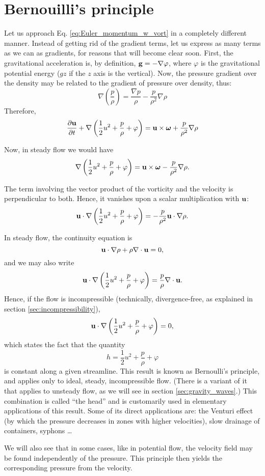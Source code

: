 \section{Bernouilli's principle}

Let us approach Eq. \ref{eq:Euler_momentum_w_vort} in a completely
different manner. Instead of getting rid of the gradient terms, let us
express as many terms as we can as gradients, for reasons that will
become clear soon. First, the gravitational acceleration is, by
definition, $\mathbf{g} = -\nabla\varphi$, where $\varphi $ is the
gravitational potential energy ($g z$ if the $z$ axis is the
vertical). Now, the pressure gradient over the density may be related
to the gradient of pressure over density, thus:
\[
\nabla
\left(
\frac{p}{\rho}
\right) =
\frac{ \nabla p }{\rho} -
\frac{ p }{\rho^2} \nabla \rho 
\]
Therefore,
\begin{equation}
  \label{eq:Bern_unsteady}
  \frac{\partial \mathbf{u} }{\partial t} +
  \nabla
  \left(
    \frac12 u^2 +
    \frac{p}{\rho} +
    \varphi
  \right)
  =
  \mathbf{u} \times\bm{\omega} +
  \frac{ p }{\rho^2} \nabla \rho 
 \end{equation}

Now, in steady flow we would have
\[
\nabla
\left(
\frac12 u^2 +
\frac{p}{\rho} +
\varphi
\right)
=
  \mathbf{u} \times\bm{\omega} -
 \frac{ p }{\rho^2} \nabla \rho  .
\]

The term involving the vector product of the vorticity and the
velocity is perpendicular to both. Hence, it vanishes upon a scalar
multiplication with $\mathbf{u}$:
\begin{equation*}
  \mathbf{u}\cdot
  \nabla
  \left(
    \frac12 u^2 +
    \frac{p}{\rho} +
    \varphi
  \right)
  = 
 - \frac{ p }{\rho^2} \mathbf{u}\cdot \nabla \rho  .
\end{equation*}
 
In steady flow, the continuity equation is
\[
\mathbf{u}\cdot \nabla \rho  +
\rho \nabla \cdot \mathbf{u} = 0 ,
\]
and we may also write
\begin{equation}
  \label{eq:Bern_u_times}
  \mathbf{u}\cdot
  \nabla
  \left(
    \frac12 u^2 +
    \frac{p}{\rho} +
    \varphi
  \right)
  = 
  \frac{ p }{\rho} \nabla\cdot\mathbf{u}.
\end{equation}
%
Hence, if the flow is incompressible (technically, divergence-free, as
explained in section \ref{sec:incompressibility}),
\[
\mathbf{u}\cdot
\nabla
\left(
\frac12 u^2 +
\frac{p}{\rho} +
\varphi
\right)
=
0 ,
\]
which states the fact that the quantity
\[
h = \frac12 u^2 + \frac{p}{\rho} + \varphi
\]
is constant along a given streamline. This result is known as
Bernoulli's principle, and applies only to ideal, steady,
incompressible flow. (There is a variant of it that applies to
unsteady flow, as we will see in section \ref{sec:gravity_waves}.)
%
This combination is called ``the head'' and is customarily used in
elementary applications of this result. Some of its direct
applications are: the Venturi effect (by which the pressure decreases
in zones with higher velocities), slow drainage of containers, syphons
\ldots

We will also see that in some cases, like in potential flow, the
velocity field may be found independently of the pressure. This
principle then yields the corresponding pressure from the velocity.

